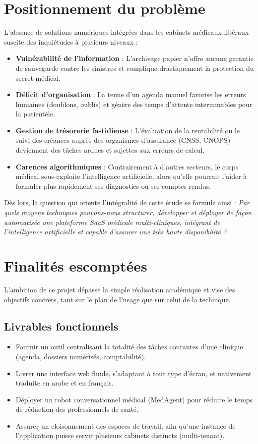 \documentclass[final]{report}
\begin{document}
\section{Positionnement du problème}\label{problematique}
L'absence de solutions numériques intégrées dans les cabinets médicaux libéraux suscite des inquiétudes à plusieurs niveaux :
\begin{itemize}
  \item \textbf{Vulnérabilité de l'information} : L'archivage papier n'offre aucune garantie de sauvegarde contre les sinistres et complique drastiquement la protection du secret médical.
  \item \textbf{Déficit d'organisation} : La tenue d'un agenda manuel favorise les erreurs humaines (doublons, oublis) et génère des temps d'attente interminables pour la patientèle.
  \item \textbf{Gestion de trésorerie fastidieuse} : L'évaluation de la rentabilité ou le suivi des créances auprès des organismes d'assurance (CNSS, CNOPS) deviennent des tâches ardues et sujettes aux erreurs de calcul.
  \item \textbf{Carences algorithmiques} : Contrairement à d'autres secteurs, le corps médical sous-exploite l'intelligence artificielle, alors qu'elle pourrait l'aider à formuler plus rapidement ses diagnostics ou ses comptes rendus.
\end{itemize}
 
Dès lors, la question qui oriente l'intégralité de cette étude se formule ainsi : \textit{Par quels moyens techniques pouvons-nous structurer, développer et déployer de façon automatisée une plateforme SaaS médicale multi-cliniques, intégrant de l'intelligence artificielle et capable d'assurer une très haute disponibilité ?}
 
\section{Finalités escomptées}
L'ambition de ce projet dépasse la simple réalisation académique et vise des objectifs concrets, tant sur le plan de l'usage que sur celui de la technique.
 
\subsection{Livrables fonctionnels}
\begin{itemize}
  \item Fournir un outil centralisant la totalité des tâches courantes d'une clinique (agenda, dossiers numérisés, comptabilité).
  \item Livrer une interface web fluide, s'adaptant à tout type d'écran, et nativement traduite en arabe et en français.
  \item Déployer un robot conversationnel médical (MedAgent) pour réduire le temps de rédaction des professionnels de santé.
  \item Assurer un cloisonnement des espaces de travail, afin qu'une instance de l'application puisse servir plusieurs cabinets distincts (multi-tenant).
\end{itemize}
 
\end{document}
